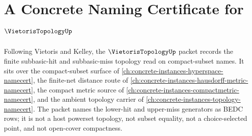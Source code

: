 \chapter{A Concrete Naming Certificate for $\VietorisTopologyUp$}
\label{ch:concrete-instances-vietoris-topology-namecert}

Following Vietoris and Kelley, the $\VietorisTopologyUp$ packet records the finite subbasic-hit and subbasic-miss topology read on compact-subset names. It sits over the compact-subset surface of \autoref{ch:concrete-instances-hyperspace-namecert}, the finite-net distance route of \autoref{ch:concrete-instances-hausdorff-metric-namecert}, the compact metric source of \autoref{ch:concrete-instances-compactmetric-namecert}, and the ambient topology carrier of \autoref{ch:concrete-instances-topology-namecert}. The packet names the lower-hit and upper-miss generators as BEDC rows; it is not a host powerset topology, not subset equality, not a choice-selected point, and not open-cover compactness.

